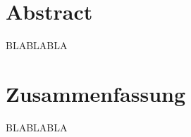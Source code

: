 \chapter*{Abstract}
\thispagestyle{empty} %

BLABLABLA

\newpage

\chapter*{Zusammenfassung}
\thispagestyle{empty} %

BLABLABLA

\clearpage %